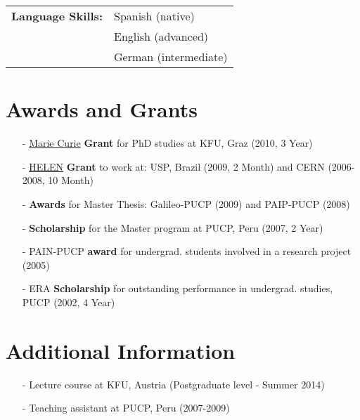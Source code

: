 \documentclass[a4paper, 10pt]{article}
\begin{document}
\vspace*{1mm}
\hspace*{-0.7cm}\begin{tabular}{ll}
{\bf Language Skills:} &
      Spanish (native)\vspace*{1mm}\\
    & English (advanced)\vspace*{1mm}\\
    & German (intermediate)\\
\end{tabular}


\vspace*{4mm}
\section{Awards and Grants}
\vspace*{2mm}
\begin{itemize}
    \item[-] \href{http://www.physik.uni-regensburg.de/STRONGnet/index.php?pg=home}{Marie Curie}
    \textbf{Grant} for PhD studies at KFU, Graz (2010, 3 Year)
    \vspace*{-1mm}

    \item[-] \href{http://www.roma1.infn.it/exp/helen/}{HELEN} 
    \textbf{Grant} to work at: USP, Brazil (2009, 2 Month) and CERN (2006-2008, 10 Month)
    \vspace*{-1mm}

    \item[-] {\bf Awards} for Master Thesis: Galileo-PUCP (2009) and PAIP-PUCP (2008)
    \vspace*{-1mm}
 
    \item[-] \textbf{Scholarship} for the Master program at PUCP, Peru (2007, 2 Year)
    \vspace*{-1mm}
    
    \item[-] PAIN-PUCP \textbf{award} for undergrad. students involved in a research project (2005)
    \vspace*{-1mm}
    
    \item[-] ERA \textbf{Scholarship} for outstanding performance in undergrad. studies, PUCP (2002, 4 Year)
\end{itemize}


\vspace*{4mm}
\section{Additional Information}
\vspace*{2mm}
\vspace*{-1mm}
\begin{itemize}
    \item[-] Lecture course at  KFU, Austria (Postgraduate level - Summer 2014)\vspace*{-2mm}
    \item[-] Teaching assistant at PUCP, Peru (2007-2009)
\end{itemize}
\end{document}
